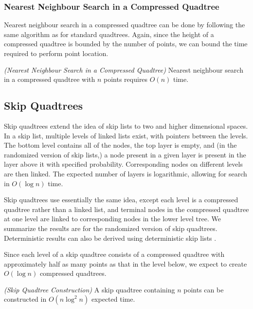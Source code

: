 \documentclass[mcs]{scsthesis}
\begin{document}
\subsubsection{Nearest Neighbour Search in a Compressed Quadtree}

Nearest neighbour search in a compressed quadtree can be done by following the
same algorithm as for standard quadtrees. Again, since the height of a compressed
quadtree is bounded by the number of points, we can bound the time required to
perform point location.

\begin{thm} \emph{(Nearest Neighbour Search in a Compressed Quadtree)} 
Nearest neighbour search in a compressed quadtree with $n$ points requires
\(O(n)\) time.
\end{thm}

\subsection{Skip Quadtrees}

Skip quadtrees extend the idea of skip lists \cite{skiplist} to two and higher
dimensional spaces. In a skip list, multiple levels of linked lists exist, with
pointers between the levels.  The bottom level contains all of the nodes, the
top layer is empty, and (in the randomized version of skip lists,) a node
present in a given layer is present in the layer above it with specified
probability.  Corresponding nodes on different levels are then linked. The
expected number of layers is logarithmic, allowing for search in \(O(\log n)\)
time.

Skip quadtrees use essentially the same idea, except each level is a
compressed quadtree rather than a linked list, and terminal nodes in the
compressed quadtree at one level are linked to corresponding nodes in the
lower level tree.  We summarize the results are for the randomized version of
skip quadtrees.  Deterministic results can also be derived using deterministic
skip lists \cite{skipquadtree}.

Since each level of a skip quadtree consists of a compressed quadtree with
approximately half as many points as that in the level below, we expect to
create \(O(\log n)\) compressed quadtrees.

\begin{thm} \emph{(Skip Quadtree Construction)}
A skip quadtree containing $n$ points can be constructed in \(O(n \log^2 n)\)
expected time.
\end{thm}
\end{document}
